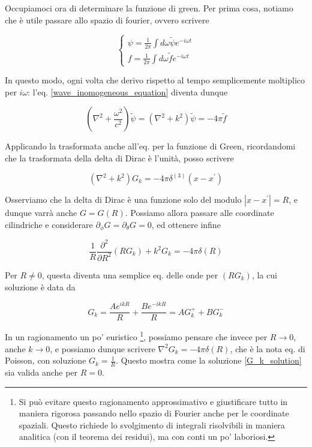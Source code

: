 \documentclass{report}
\begin{document}
Occupiamoci ora di determinare la funzione di green. Per prima cosa, notiamo che è utile passare allo spazio di fourier, ovvero scrivere 

\[\begin{cases}
    \psi = \frac{1}{2\pi} \int d\omega \tilde{\psi}e^{-i\omega t} \\
    f = \frac{1}{2\pi} \int d\omega \tilde{f}e^{-i\omega t} 
\end{cases}\]

In questo modo, ogni volta che derivo rispetto al tempo semplicemente moltiplico per $i\omega$: l'eq. \ref{wave_inomogeneous_equation} diventa dunque

\begin{equation}
    \left(\nabla^2 + \frac{\omega^2}{c^2}\right)\tilde{\psi} = \left(\nabla^2 + k^2\right)\tilde{\psi} = -4\pi\tilde{f}
\end{equation}

Applicando la trasformata anche all'eq. per la funzione di Green, ricordandomi che la trasformata della delta di Dirac è l'unità, posso scrivere 

\begin{equation}
    (\nabla^2 + k^2)G_k = -4\pi \delta^{(3)}(x-x^{'})
\end{equation}

Osserviamo che la delta di Dirac è una funzione solo del modulo $|x-x^{'}| = R$, e dunque varrà anche $G=G(R)$. Possiamo allora passare alle coordinate cilindriche e considerare $\partial_\phi G= \partial_\theta G =0$, ed ottenere infine 

\begin{equation}
    \frac{1}{R}\frac{\partial^2}{\partial R^2}(RG_k) + k^2G_k = -4\pi\delta(R)
\end{equation}

Per $R\neq 0$, questa diventa una semplice eq. delle onde per $(RG_k)$, la cui soluzione è data da 

\begin{equation}
    \label{G_k_solution}
    G_k = \frac{Ae^{ikR}}{R} + \frac{Be^{-ikR}}{R} = AG_k^+ + BG_k^-
\end{equation}

In un ragionamento un po' euristico \footnote{Si può evitare questo ragionamento approssimativo e giustificare tutto in maniera rigorosa passando nello spazio di Fourier anche per le coordinate spaziali. Questo richiede lo svolgimento di integrali risolvibili in maniera analitica (con il teorema dei residui), ma con conti un po' laboriosi.}, possiamo pensare che invece per $R \rightarrow0$, anche $k \rightarrow 0$, e possiamo dunque scrivere $\nabla^2G_k = -4\pi\delta(R)$, che è la nota eq. di Poisson, con soluzione $G_k = \frac{1}{R}$. Questo mostra come la soluzione \ref{G_k_solution} sia valida anche per $R=0$. 
\end{document}
